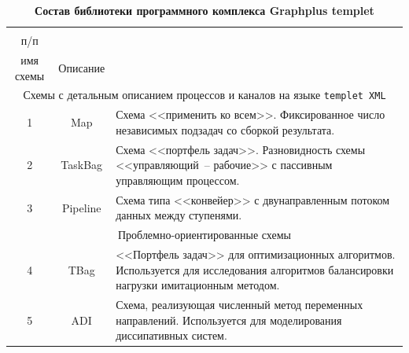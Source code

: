 \begin{table}[p!]

\centering

\small

\caption{\bf Состав библиотеки программного комплекса Graphplus templet} \vspace{-3mm} \centering

\begin{tabular}{c|c|p{10cm}}

\hline 

\cbox{\footnotesize № \\\footnotesize п/п} & 

\cbox{\footnotesize Кодовое \\ \footnotesize имя схемы} & 

\multicolumn{1}{c}{\footnotesize Описание}

\\

\hline

\multicolumn{3}{c}{\rule{0mm}{12pt}Схемы с детальным описанием процессов и каналов на языке {\tt templet XML}}\\

\hline

\rule{0mm}{12pt}%

1 & Map & Схема <<применить ко всем>>. Фиксированное число независимых подзадач со сборкой результата.\\

\rule{0mm}{12pt}%

2 & TaskBag & Схема <<портфель задач>>. Разновидность схемы <<управляющий~-- рабочие>> с пассивным управляющим процессом.\\

\rule{0mm}{12pt}%

3 & Pipeline & Схема типа <<конвейер>> с двунаправленным потоком данных между ступенями.\\

\hline

\multicolumn{3}{c}{\rule{0mm}{12pt}Проблемно-ориентированные схемы}\\

\hline

\rule{0mm}{12pt}%

4 & TBag & <<Портфель задач>> для оптимизационных алгоритмов. Используется для исследования алгоритмов балансировки нагрузки имитационным методом.\\

\rule{0mm}{12pt}%

5 & ADI & Схема, реализующая численный метод переменных направлений. Используется для моделирования диссипативных систем.\\


\end{tabular}
\end{table}
